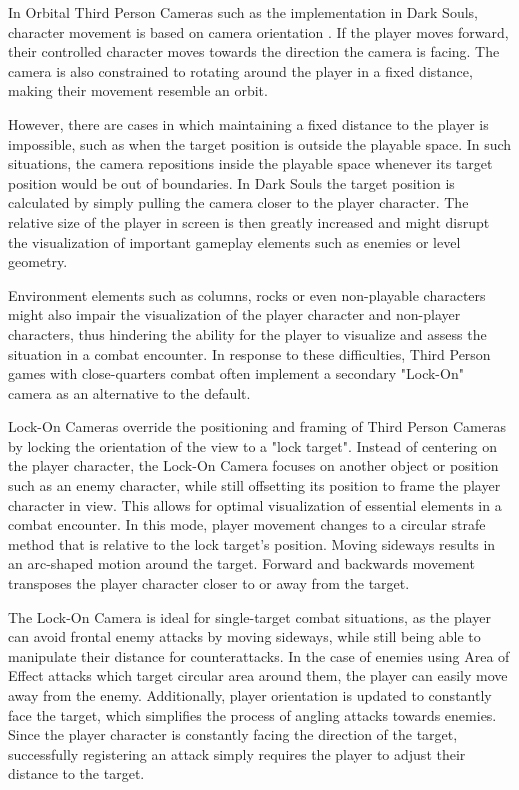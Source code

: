 In Orbital Third Person Cameras such as the implementation in Dark Souls, character movement is based on camera orientation \cite{BOOK_RealTimeCameras}. If the player moves forward, their controlled character moves towards the direction the camera is facing. The camera is also constrained to rotating around the player in a fixed distance, making their movement resemble an orbit.

However, there are cases in which maintaining a fixed distance to the player is impossible, such as when the target position is outside the playable space. In such situations, the camera repositions inside the playable space whenever its target position would be out of boundaries. In Dark Souls the target position is calculated by simply pulling the camera closer to the player character. The relative size of the player in screen is then greatly increased and might disrupt the visualization of important gameplay elements such as enemies or level geometry. 

Environment elements such as columns, rocks or even non-playable characters might also impair the visualization of the player character and non-player characters, thus hindering the ability for the player to visualize and assess the situation in a combat encounter. In response to these difficulties, Third Person games with close-quarters combat often implement a secondary "Lock-On" camera as an alternative to the default.

Lock-On Cameras override the positioning and framing of Third Person Cameras by locking the orientation of the view to a "lock target". Instead of centering on the player character, the Lock-On Camera focuses on another object or position such as an enemy character, while still offsetting its position to frame the player character in view. This allows for optimal visualization of essential elements in a combat encounter. In this mode, player movement changes to a circular strafe method that is relative to the lock target's position. Moving sideways results in an arc-shaped motion around the target. Forward and backwards movement transposes the player character closer to or away from the target.

The Lock-On Camera is ideal for single-target combat situations, as the player can avoid frontal enemy attacks by moving sideways, while still being able to manipulate their  distance for counterattacks. In the case of enemies using Area of Effect attacks which target circular area around them, the player can easily move away from the enemy. Additionally, player orientation is updated to constantly face the target, which simplifies the process of angling attacks towards enemies. Since the player character is constantly facing the direction of the target, successfully registering an attack simply requires the player to adjust their distance to the target.

